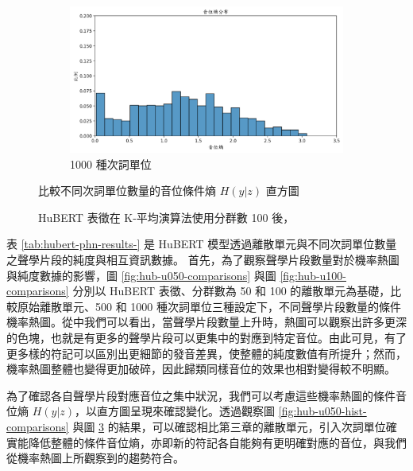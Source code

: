 {{{\begin{figure}
\begin{subfigure}{\textwidth}
                 \label{fig:hub-u100-ap0500-phnent-hist}
             \end{subfigure}
             \vfill
             \begin{subfigure}{\textwidth}
                 \centering
                 \includegraphics[width=\tempwidth]{figures/ch4figs/hub-u100-ap1000-phnent-hist.png}
                 \caption{1000 種次詞單位}
                 \label{fig:hub-u100-ap1000-phnent-hist}
             \end{subfigure}

             \caption{HuBERT 表徵在 K-平均演算法使用分群數 100 後，}
             比較不同次詞單位數量的音位條件熵 $H(y|z)$ 直方圖
             \label{fig:hub-u100-hist-comparisons}
        \end{figure}
    }
}


表 \ref{tab:hubert-phn-results-} 是 HuBERT 模型透過離散單元與不同次詞單位數量之聲學片段的純度與相互資訊數據。
首先，為了觀察聲學片段數量對於機率熱圖與純度數據的影響，圖 \ref{fig:hub-u050-comparisons} 與圖 \ref{fig:hub-u100-comparisons} 分別以
HuBERT 表徵、分群數為 50 和 100 的離散單元為基礎，比較原始離散單元、500 和 1000 種次詞單位三種設定下，不同聲學片段數量的條件機率熱圖。從中我們可以看出，當聲學片段數量上升時，熱圖可以觀察出許多更深的色塊，也就是有更多的聲學片段可以更集中的對應到特定音位。由此可見，有了更多樣的符記可以區別出更細節的發音差異，使整體的純度數值有所提升；然而，機率熱圖整體也變得更加破碎，因此歸類同樣音位的效果也相對變得較不明顯。

        為了確認各自聲學片段對應音位之集中狀況，我們可以考慮這些機率熱圖的條件音位熵 $H(y|z)$，以直方圖呈現來確認變化。透過觀察圖 \ref{fig:hub-u050-hist-comparisons} 與圖 \ref{fig:hub-u100-hist-comparisons} 的結果，可以確認相比第三章的離散單元，引入次詞單位確實能降低整體的條件音位熵，亦即新的符記各自能夠有更明確對應的音位，與我們從機率熱圖上所觀察到的趨勢符合。
        

}
